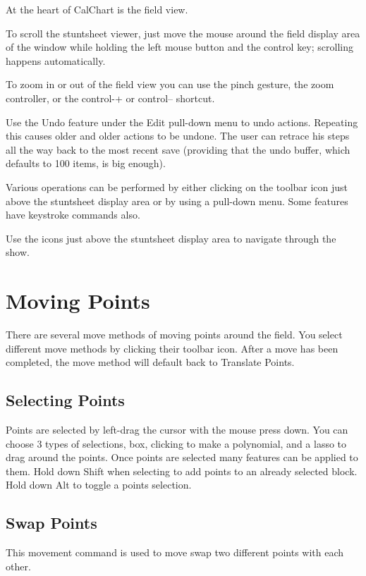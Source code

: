 At the heart of CalChart is the field view.

To scroll the stuntsheet viewer, just move the mouse around the field
display area of the window while holding the left mouse button and the control key; scrolling happens
automatically.

To zoom in or out of the field view you can use the pinch gesture, the zoom controller, or the control-+ or control-- shortcut.

Use the Undo feature under the Edit pull-down menu to undo actions.
Repeating this causes older and older actions to be undone.  The user
can retrace his steps all the way back to the most recent save
(providing that the undo buffer, which defaults to 100 items, is big enough).

Various operations can be performed by either clicking on the toolbar icon just
above the stuntsheet display area or by using a pull-down menu.  Some
features have keystroke commands also.

Use the icons just above the stuntsheet display area to navigate through the show.

\section{Moving Points}\label{movement}

There are several move methods of moving points around the field.  You select
different move methods by clicking their toolbar icon.  After a move has been
completed, the move method will default back to Translate Points.

\subsection{Selecting Points}\label{selectingpoints}

Points are selected by left-drag the cursor with the mouse press down.  You can choose 3 types of selections,
box, clicking to make a polynomial, and a lasso to drag around the points.
Once points are selected many features can be applied to them.
Hold down Shift when selecting to add points to an already selected block.
Hold down Alt to toggle a points selection.

\subsection{Swap Points}\label{swappoints}

This movement command is used to move swap two different points with each other.

